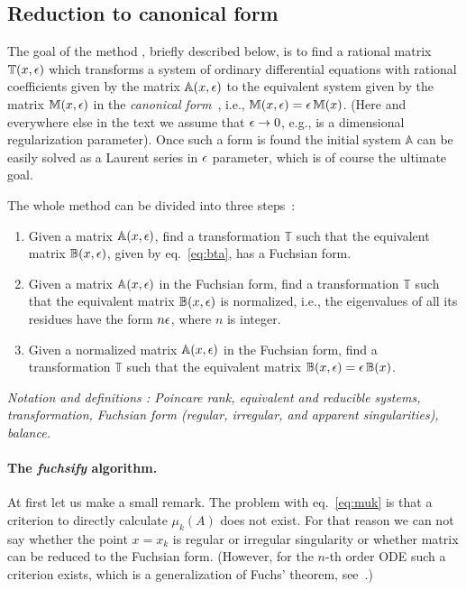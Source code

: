 \documentclass[12pt,a4paper]{article}
\def\M#1{\mathbb{#1}} %
\begin{document}
\subsection{Reduction to canonical form}

The goal of the method \cite{Lee15}, briefly described below, is to find a rational matrix $\M T(x,\eps)$ which transforms a system of ordinary differential equations with rational coefficients given by the matrix $\M A(x,\eps)$ to the equivalent system given by the matrix $\M M(x,\eps)$ in the {\em canonical form}~\cite{Henn13}, i.e., $\M M(x,\eps) = \eps\, \M M(x)$.
(Here and everywhere else in the text we assume that $\epsilon \to 0$, e.g., is a dimensional regularization parameter).
Once such a form is found the initial system $\M A$ can be easily solved as a Laurent series in $\epsilon$ parameter, which is of course the ultimate goal.

The whole method can be divided into three steps~\cite{Lee15}:
\begin{enumerate}
  \item Given a matrix $\M A(x,\eps)$, find a transformation $\M T$ such that the equivalent matrix $\M B(x,\eps)$, given by eq.~\eqref{eq:bta}, has a Fuchsian form.
  \item Given a matrix $\M A(x,\eps)$ in the Fuchsian form, find a transformation $\M T$ such that the equivalent matrix $\M B(x,\eps)$ is normalized, i.e., the eigenvalues of all its residues have the form $n \epsilon$, where $n$ is integer.
  \item Given a normalized matrix $\M A(x,\eps)$ in the Fuchsian form, find a transformation $\M T$ such that the equivalent matrix $\M B(x,\eps) = \eps \, \M B(x)$.
\end{enumerate}

{\it Notation and definitions \cite{Mos59}: Poincare rank, equivalent and reducible systems, transformation, Fuchsian form (regular, irregular, and apparent singularities), balance.}


\paragraph{The {\em fuchsify} algorithm.}

At first let us make a small remark.
The problem with eq.~\eqref{eq:muk} is that a criterion to directly calculate $\mu_k(A)$ does not exist.
For that reason we can not say whether the point $x=x_k$ is regular or irregular singularity or whether matrix can be reduced to the Fuchsian form.
(However, for the $n$-th order ODE such a criterion exists, which is a generalization of Fuchs' theorem, see~\cite{Mos59}.)
\end{document}
